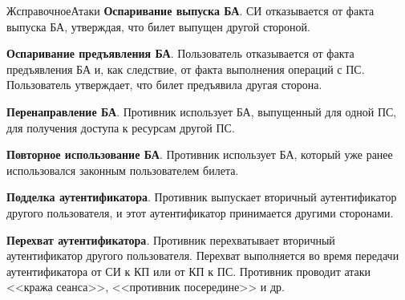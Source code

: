 \begin{appendix}{Ж}{справочное}{Атаки}
{\bf Оспаривание выпуска БА}.
СИ отказывается от факта выпуска БА,
утверждая, что билет выпущен другой стороной.


{\bf Оспаривание предъявления БА}.
Пользователь отказывается от факта предъявления БА
и, как следствие, от факта выполнения операций с ПС.
Пользователь утверждает, что билет предъявила другая сторона.


{\bf Перенаправление БА}.
Противник использует БА, выпущенный для одной ПС,
для получения доступа к ресурсам другой ПС. 


{\bf Повторное использование БА}.
Противник использует БА, который уже ранее 
использовался законным пользователем билета.


{\bf Подделка аутентификатора}.
Противник выпускает вторичный аутентификатор другого 
пользователя, и этот аутентификатор принимается другими сторонами. 


{\bf Перехват аутентификатора}.
Противник перехватывает вторичный аутентификатор другого пользователя.
Перехват выполняется во время передачи аутентификатора от СИ к КП или 
от КП к ПС. Противник проводит атаки <<кража сеанса>>, <<противник посередине>>
и др. 



\end{appendix}
